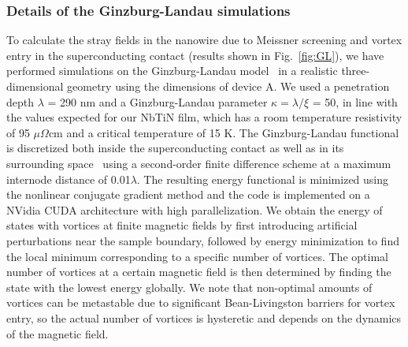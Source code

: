 \subsubsection{Details of the Ginzburg-Landau simulations}
To calculate the stray fields in the nanowire due to Meissner screening and vortex entry in the superconducting contact (results shown in Fig.~\ref{fig:GL}), we have performed simulations on the Ginzburg-Landau model~\cite{Gropp1996} in a realistic three-dimensional geometry using the dimensions of device A.
We used a penetration depth $\lambda$ = 290 nm and a Ginzburg-Landau parameter $\kappa = \lambda / \xi$ = 50, in line with the values expected for our NbTiN film, which has a room temperature resistivity of 95 $\mu \Omega$cm and a critical temperature of 15 K.
The Ginzburg-Landau functional is discretized both inside the superconducting contact as well as in its surrounding space~\cite{Du1999} using a second-order finite difference scheme at a maximum internode distance of 0.01$\lambda$.
The resulting energy functional is minimized using the nonlinear conjugate gradient method and the code is implemented on a NVidia CUDA architecture with high parallelization.
We obtain the energy of states with vortices at finite magnetic fields by first introducing artificial perturbations near the sample boundary, followed by energy minimization to find the local minimum corresponding to a specific number of vortices.
The optimal number of vortices at a certain magnetic field is then determined by finding the state with the lowest energy globally.
We note that non-optimal amounts of vortices can be metastable due to significant Bean-Livingston barriers for vortex entry, so the actual number of vortices is hysteretic and depends on the dynamics of the magnetic field.

